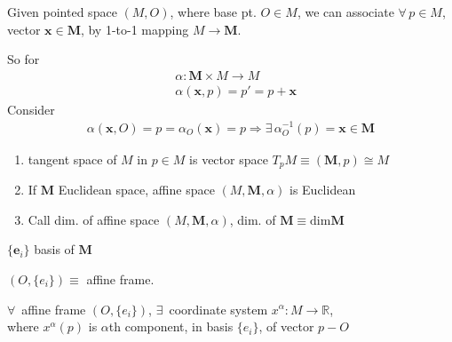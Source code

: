 Given pointed space $(M, O)$, where base pt. $O\in M$, we can associate $\forall \, p \in M$, vector $\mathbf{x} \in \mathbf{M}$, by 1-to-1 mapping $M\to \mathbf{M}$. 

So for 
\[
\begin{aligned}
& \alpha : \mathbf{M} \times M \to M \\ 
& \alpha(\mathbf{x}, p) = p' = p + \mathbf{x}
\end{aligned}
\]
Consider 
\[
\begin{gathered}
	\alpha(\mathbf{x}, O) = p = \alpha_O(\mathbf{x}) = p \Longrightarrow \exists \, \alpha_O^{-1}(p) = \mathbf{x} \in \mathbf{M}
\end{gathered}
\]

\begin{enumerate}
	\item tangent space of $M$ in $p\in M$ is vector space $T_pM \equiv (\mathbf{M}, p) \cong M$
	\item If $\mathbf{M}$ Euclidean space, affine space $(M, \mathbf{M}, \alpha)$ is Euclidean
	\item Call dim. of affine space $(M, \mathbf{M}, \alpha)$, dim. of $\mathbf{M} \equiv \text{dim}{\mathbf{M}}$
\end{enumerate}
$\lbrace \mathbf{e}_i \rbrace$ basis of $\mathbf{M}$




\begin{definition}
  $(O, \lbrace e_i \rbrace) \equiv $ affine frame.

  $\forall \, $ affine frame $(O,\lbrace e_i \rbrace)$, $\exists \, $ coordinate system $x^{\alpha} : M \to \mathbb{R}$, \\
  where $x^{\alpha}(p)$ is $\alpha$th component, in basis $\lbrace e_i \rbrace$, of vector $p-O$
  \end{definition}

